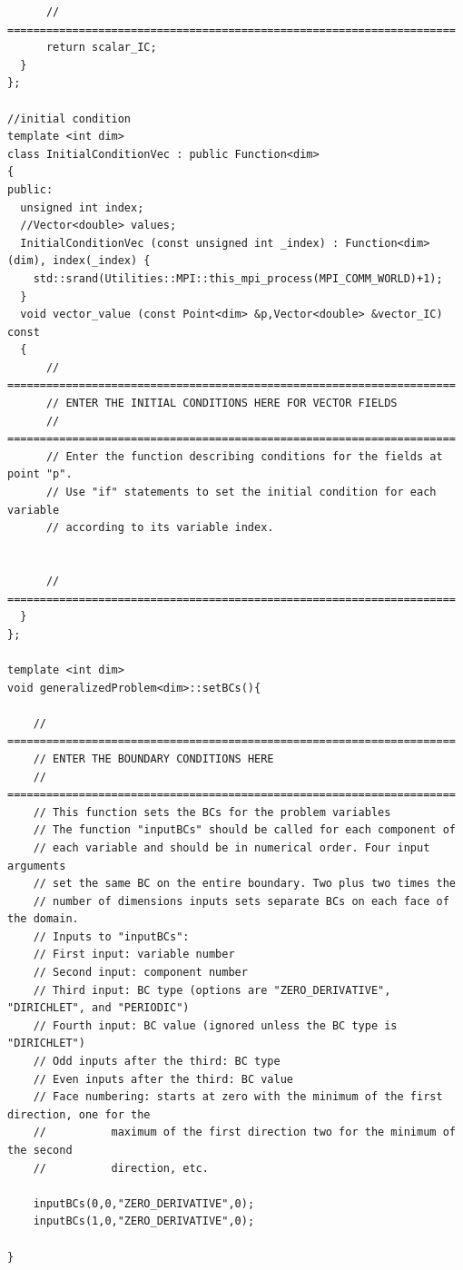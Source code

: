 \documentclass[10pt]{article} %
\begin{document}
\begin{lstlisting}
	  // =====================================================================
	  return scalar_IC;
  }
};

//initial condition
template <int dim>
class InitialConditionVec : public Function<dim>
{
public:
  unsigned int index;
  //Vector<double> values;
  InitialConditionVec (const unsigned int _index) : Function<dim>(dim), index(_index) {
    std::srand(Utilities::MPI::this_mpi_process(MPI_COMM_WORLD)+1);
  }
  void vector_value (const Point<dim> &p,Vector<double> &vector_IC) const
  {
	  // =====================================================================
	  // ENTER THE INITIAL CONDITIONS HERE FOR VECTOR FIELDS
	  // =====================================================================
	  // Enter the function describing conditions for the fields at point "p".
	  // Use "if" statements to set the initial condition for each variable
	  // according to its variable index.


	  // =====================================================================
  }
};

template <int dim>
void generalizedProblem<dim>::setBCs(){

	// =====================================================================
	// ENTER THE BOUNDARY CONDITIONS HERE
	// =====================================================================
	// This function sets the BCs for the problem variables
	// The function "inputBCs" should be called for each component of
	// each variable and should be in numerical order. Four input arguments
	// set the same BC on the entire boundary. Two plus two times the
	// number of dimensions inputs sets separate BCs on each face of the domain.
	// Inputs to "inputBCs":
	// First input: variable number
	// Second input: component number
	// Third input: BC type (options are "ZERO_DERIVATIVE", "DIRICHLET", and "PERIODIC")
	// Fourth input: BC value (ignored unless the BC type is "DIRICHLET")
	// Odd inputs after the third: BC type
	// Even inputs after the third: BC value
	// Face numbering: starts at zero with the minimum of the first direction, one for the 
	//			maximum of the first direction two for the minimum of the second 
	//			direction, etc.

	inputBCs(0,0,"ZERO_DERIVATIVE",0);
	inputBCs(1,0,"ZERO_DERIVATIVE",0);

}
\end{lstlisting}
\normalsize
\end{document}
